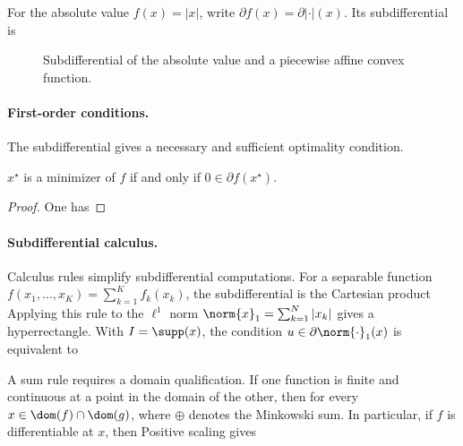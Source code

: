 For the absolute value $f(x)=|x|$, write $\partial f(x) = \partial |\cdot|(x)$. Its subdifferential is

\begin{figure}[tbp]
\centering
{}
\caption{Subdifferential of the absolute value and a piecewise affine convex function.}
\label{fig-subdiff-l1}
\end{figure}







\paragraph{First-order conditions.}

The subdifferential gives a necessary and sufficient optimality condition.

\begin{prop}
	$x^\star$ is a minimizer of $f$ if and only if $0 \in \partial f(x^\star)$.
\end{prop}
\begin{proof}
	One has
\end{proof}

\paragraph{Subdifferential calculus.}

Calculus rules simplify subdifferential computations. For a separable function $f(x_1,\ldots,x_K)=\sum_{k=1}^K f_k(x_k)$, the subdifferential is the Cartesian product
Applying this rule to the $\ell^1$ norm $\norm{x}_1=\sum_{k=1}^N |x_k|$ gives
a hyperrectangle. With $I = \supp(x)$, the condition $u \in \partial \norm{\cdot}_1(x)$ is equivalent to

A sum rule requires a domain qualification. If one function is finite and continuous at a point in the domain of the other, then for every $x\in\dom(f)\cap\dom(g)$,
where $\oplus$ denotes the Minkowski sum. In particular, if $f$ is differentiable at $x$, then
Positive scaling gives

